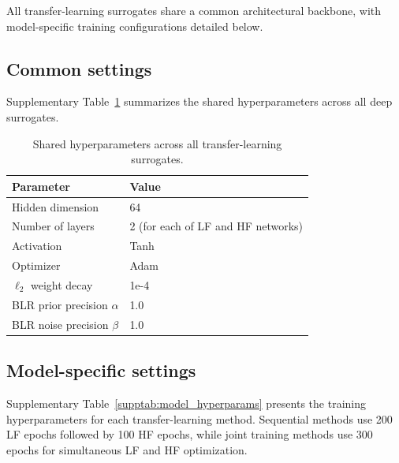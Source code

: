 \documentclass[11pt,a4paper]{article}%
\begin{document}

All transfer-learning surrogates share a common architectural backbone, with model-specific training
configurations detailed below.

\subsection{Common settings}
\label{suppsec:common_settings}
Supplementary Table~\ref{supptab:common_hyperparams} summarizes the shared hyperparameters across all deep
surrogates.

\begin{table}[h]
\centering
\caption{Shared hyperparameters across all transfer-learning surrogates.}
\label{supptab:common_hyperparams}
\begin{tabular}{ll}
\toprule
\textbf{Parameter} & \textbf{Value} \\
\midrule
Hidden dimension & 64 \\
Number of layers & 2 (for each of LF and HF networks) \\
Activation & Tanh \\
Optimizer & Adam \\
$\ell_2$ weight decay & 1e-4 \\
BLR prior precision $\alpha$ & 1.0 \\
BLR noise precision $\beta$ & 1.0 \\
\bottomrule
\end{tabular}
\end{table}

\subsection{Model-specific settings}
\label{suppsec:model_settings}
Supplementary Table~\ref{supptab:model_hyperparams} presents the training hyperparameters for each transfer-learning
method. Sequential methods use 200 LF epochs followed by 100 HF epochs, while
joint training methods use 300 epochs for simultaneous LF and HF optimization.
\end{document}
